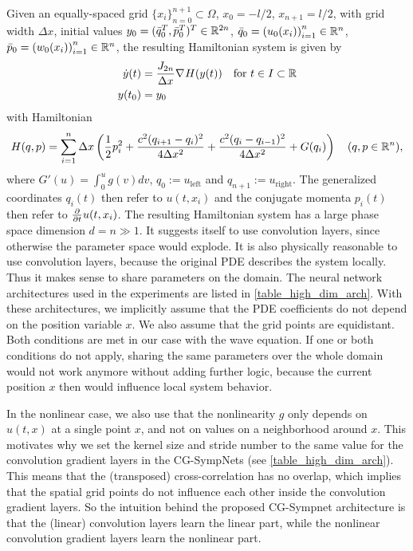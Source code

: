 \documentclass[twoside,a4paper]{article}
\begin{document}
Given an equally-spaced grid $\{ x_i \}_{n=0}^{n+1} \subset \Omega$, $x_0 = -l/2$, $x_{n+1} = l/2$,
with grid width $\Delta x$,
initial values $y_0 = (\bar{q}_0^T, \bar{p}_0^T)^T \in \mathbb{R}^{2n}$, $\bar{q}_0 = \left( u_0(x_i) \right)_{i=1}^n \in \mathbb{R}^n$, 
$\bar{p}_0 = \left( w_0(x_i) \right)_{i=1}^n \in \mathbb{R}^n$,
the resulting Hamiltonian system is given by
\begin{align*}
	\dot{y}(t) &= \frac{J_{2n}}{\Delta x} \nabla_{}{H}(y(t)) \quad \text{for } t \in I \subset \mathbb{R} \\
	y(t_0) &= y_0
\end{align*}
with Hamiltonian
\begin{equation*}
	H(q,p) = \sum_{i=1}^n \Delta x \left( 
	\frac{1}{2} p_i^2 + \frac{c^2 (q_{i+1} - q_i)^2}{4 \Delta x^2} 
	+ \frac{c^2 (q_i - q_{i-1})^2}{4 \Delta x^2} + G(q_i)
	\right)
	\quad (q,p \in \mathbb{R}^n)
	,
\end{equation*}
where $G'(u) = \int_0^u g(v) dv$, $q_0 := u_{\text{left}}$ and $q_{n+1} := u_{\text{right}}$.
The generalized coordinates $q_i(t)$ then refer to $u(t,x_i)$ and 
the conjugate momenta $p_i(t)$ then refer to $\frac{\partial }{\partial t} u(t,x_i)$.
The resulting Hamiltonian system has a large phase space dimension $d=n \gg 1$.
It suggests itself to use convolution layers, since otherwise
the parameter space would explode. It is also physically reasonable
to use convolution layers, because the original PDE describes the system locally.
Thus it makes sense to share parameters on the domain.
The neural network architectures used in the experiments
are listed in \cref{table_high_dim_arch}. With these architectures,
we implicitly assume that the PDE coefficients do not depend on the position variable $x$.
We also assume that the grid points are equidistant. Both conditions are met
in our case with the wave equation. If one or both conditions do not apply, sharing the same
parameters over the whole domain would not work anymore without 
adding further logic, because the current position $x$ then would influence
local system behavior.

In the nonlinear case, we also use that the nonlinearity $g$ 
only depends on $u(t,x)$ at a single point $x$, and not
on values on a neighborhood around $x$. 
This motivates why we set the kernel size and stride number
to the same value for the convolution gradient layers in 
the CG-SympNets (see \cref{table_high_dim_arch}).
This means that the (transposed) cross-correlation
has no overlap, which implies that the spatial grid points do not influence each other
inside the convolution gradient layers.
So the intuition behind the 
proposed CG-Sympnet architecture is that the (linear) convolution layers learn the
linear part, while the nonlinear convolution gradient layers learn the nonlinear part.
\end{document}
